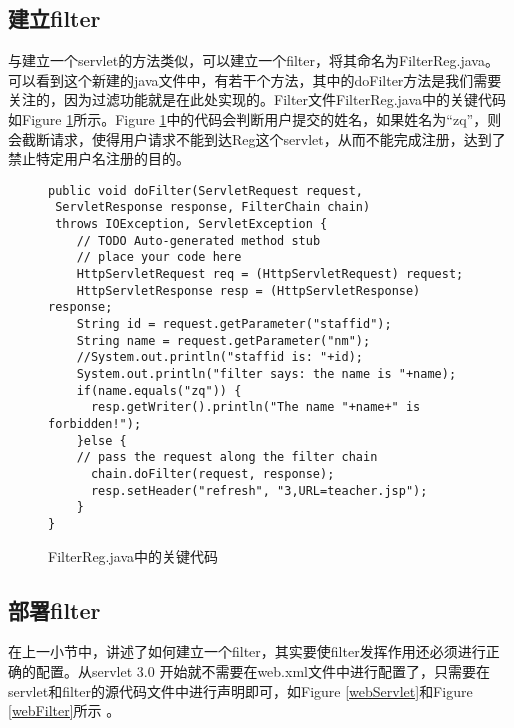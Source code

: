 \documentclass[a4paper]{book}
\begin{document}
\subsection{建立filter}
与建立一个servlet的方法类似，可以建立一个filter，将其命名为FilterReg.java。可以看到这个新建的java文件中，有若干个方法，其中的doFilter方法是我们需要关注的，因为过滤功能就是在此处实现的。Filter文件FilterReg.java中的关键代码如Figure \ref{filterReg}所示。Figure \ref{filterReg}中的代码会判断用户提交的姓名，如果姓名为“zq”，则会截断请求，使得用户请求不能到达Reg这个servlet，从而不能完成注册，达到了禁止特定用户名注册的目的。
\begin{figure}
\begin{lstlisting}
public void doFilter(ServletRequest request, 
 ServletResponse response, FilterChain chain)
 throws IOException, ServletException {
	// TODO Auto-generated method stub
	// place your code here
	HttpServletRequest req = (HttpServletRequest) request; 
	HttpServletResponse resp = (HttpServletResponse) response;
	String id = request.getParameter("staffid");
	String name = request.getParameter("nm");
	//System.out.println("staffid is: "+id);
	System.out.println("filter says: the name is "+name);
	if(name.equals("zq")) {
	  resp.getWriter().println("The name "+name+" is forbidden!");
	}else {
	// pass the request along the filter chain
	  chain.doFilter(request, response);
	  resp.setHeader("refresh", "3,URL=teacher.jsp");
	}
}
\end{lstlisting}
\caption{FilterReg.java中的关键代码}
\label{filterReg}
\end{figure}
\subsection{部署filter}
在上一小节中，讲述了如何建立一个filter，其实要使filter发挥作用还必须进行正确的配置。从servlet 3.0 开始就不需要在web.xml文件中进行配置了，只需要在servlet和filter的源代码文件中进行声明即可，如Figure \ref{webServlet}和Figure \ref{webFilter}所示 。
\end{document}
